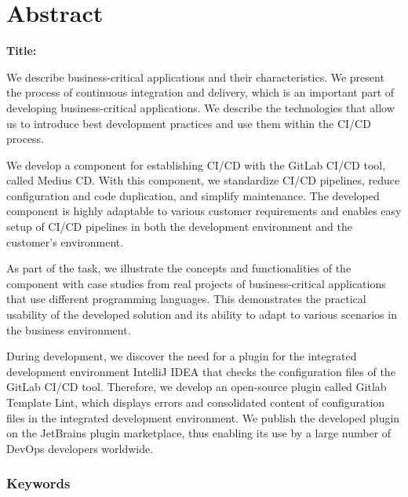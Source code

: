 \chapter*{Abstract}

\noindent\textbf{Title:} \ttitleEn
\bigskip

We describe business-critical applications and their characteristics. We present the process of continuous integration and delivery, which is an important part of developing business-critical applications. We describe the technologies that allow us to introduce best development practices and use them within the CI/CD process. 

We develop a component for establishing CI/CD with the GitLab CI/CD tool, called Medius CD. With this component, we standardize CI/CD pipelines, reduce configuration and code duplication, and simplify maintenance. The developed component is highly adaptable to various customer requirements and enables easy setup of CI/CD pipelines in both the development environment and the customer's environment.

As part of the task, we illustrate the concepts and functionalities of the component with case studies from real projects of business-critical applications that use different programming languages. This demonstrates the practical usability of the developed solution and its ability to adapt to various scenarios in the business environment.

During development, we discover the need for a plugin for the integrated development environment IntelliJ IDEA that checks the configuration files of the GitLab CI/CD tool. Therefore, we develop an open-source plugin called Gitlab Template Lint, which displays errors and consolidated content of configuration files in the integrated development environment. We publish the developed plugin on the JetBrains plugin marketplace, thus enabling its use by a large number of DevOps developers worldwide.

\subsection*{Keywords}
\textit{\tkeywordsEn}
\clearemptydoublepage